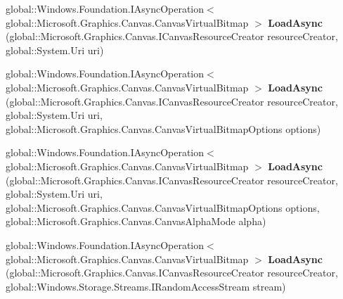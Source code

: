 \begin{DoxyCompactItemize}
\item 
\mbox{\label{interface_microsoft_1_1_graphics_1_1_canvas_1_1_i_canvas_virtual_bitmap_statics_a230e794a4930f665b4ac7d220c2671da}} 
global\+::\+Windows.\+Foundation.\+I\+Async\+Operation$<$ global\+::\+Microsoft.\+Graphics.\+Canvas.\+Canvas\+Virtual\+Bitmap $>$ {\bfseries Load\+Async} (global\+::\+Microsoft.\+Graphics.\+Canvas.\+I\+Canvas\+Resource\+Creator resource\+Creator, global\+::\+System.\+Uri uri)
\item 
\mbox{\label{interface_microsoft_1_1_graphics_1_1_canvas_1_1_i_canvas_virtual_bitmap_statics_ae4cad80705e97acdc853863be82a2edd}} 
global\+::\+Windows.\+Foundation.\+I\+Async\+Operation$<$ global\+::\+Microsoft.\+Graphics.\+Canvas.\+Canvas\+Virtual\+Bitmap $>$ {\bfseries Load\+Async} (global\+::\+Microsoft.\+Graphics.\+Canvas.\+I\+Canvas\+Resource\+Creator resource\+Creator, global\+::\+System.\+Uri uri, global\+::\+Microsoft.\+Graphics.\+Canvas.\+Canvas\+Virtual\+Bitmap\+Options options)
\item 
\mbox{\label{interface_microsoft_1_1_graphics_1_1_canvas_1_1_i_canvas_virtual_bitmap_statics_ac1747ce10fe0cd80d92ea79b088c0fa3}} 
global\+::\+Windows.\+Foundation.\+I\+Async\+Operation$<$ global\+::\+Microsoft.\+Graphics.\+Canvas.\+Canvas\+Virtual\+Bitmap $>$ {\bfseries Load\+Async} (global\+::\+Microsoft.\+Graphics.\+Canvas.\+I\+Canvas\+Resource\+Creator resource\+Creator, global\+::\+System.\+Uri uri, global\+::\+Microsoft.\+Graphics.\+Canvas.\+Canvas\+Virtual\+Bitmap\+Options options, global\+::\+Microsoft.\+Graphics.\+Canvas.\+Canvas\+Alpha\+Mode alpha)
\item 
\mbox{\label{interface_microsoft_1_1_graphics_1_1_canvas_1_1_i_canvas_virtual_bitmap_statics_aee81585da1cf32d9da0d24e264902778}} 
global\+::\+Windows.\+Foundation.\+I\+Async\+Operation$<$ global\+::\+Microsoft.\+Graphics.\+Canvas.\+Canvas\+Virtual\+Bitmap $>$ {\bfseries Load\+Async} (global\+::\+Microsoft.\+Graphics.\+Canvas.\+I\+Canvas\+Resource\+Creator resource\+Creator, global\+::\+Windows.\+Storage.\+Streams.\+I\+Random\+Access\+Stream stream)

\end{DoxyCompactItemize}
